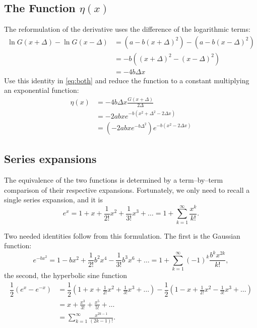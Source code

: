 \documentclass[10pt, oneside]{article}
\newcommand{\paren}[1]			{ \left(  #1 \right) }
\begin{document}
\subsection{The Function $\eta(x)$}
The reformulation of the derivative uses the difference of the logarithmic terms:
\begin{equation}
	\begin{split}
		\ln G\paren{x + \Delta} - \ln G\paren{x - \Delta} 
			&= \paren{a - b \paren{x+\Delta}^{2}} - \paren{a - b \paren{x-\Delta}^{2}} \\
			&= -b \paren{\paren{x+\Delta}^{2} - \paren{x-\Delta}^{2}} \\
			&= -4b\Delta x
	\end{split}
\end{equation}
Use this identity in \eqref{eq:both} and reduce the function to a constant multiplying an exponential function:
\begin{equation}
	\begin{split}
		\eta ( x )  &= -4b\Delta x \frac {G\paren{x + \Delta}} {2\Delta} \\
			&= -2abx e^{-b\paren{x^{2}+\Delta^{2}-2\Delta x}} \\
			&= \paren{-2abx e^{-b\Delta^{2}}} e^{-b\paren{x^{2}-2\Delta x}}
	\end{split}
\label{eq:eta}
\end{equation}

\subsection{Series expansions}
The equivalence of the two functions is determined by a term--by--term comparison of their respective expansions. Fortunately, we only need to recall a single series expansion, and it is
\begin{equation}
	e^{x} = 1 + x + \frac{1}{2!}x^{2} + \frac{1}{3!}x^{3} + \dots = 1 + \sum_{k=1}^{\infty} \frac{x^{k}}{k!}.
\label{eq:primus}
\end{equation}

Two needed identities follow from this formulation. The first is the Gaussian function:
\begin{equation}
	e^{-b x^{2}} = 1 - bx^{2} + \frac{1}{2!}b^{2}x^{4} - \frac{1}{3!}b^{3}x^{6} + \dots = 1 + \sum_{k=1}^{\infty} (-1)^{k}\frac{b^{k}x^{2k}}{k!},
\label{eq:secundus}
\end{equation}
the second, the hyperbolic sine function
\begin{equation}
	\begin{split}
		\dfrac{1}{2} \paren{e^{x} - e^{-x}} 
			&= \dfrac{1}{2} \paren{1 + x + \frac{1}{2!}x^{2} + \frac{1}{3!}x^{3} + \dots } - \dfrac{1}{2} \paren{1 - x + \frac{1}{2!}x^{2} - \frac{1}{3!}x^{3} + \dots} \\
			&= x + \frac{x^{3}}{3!}  + \frac{x^{5}}{5!} + \dots \\
			&= \sum_{k=1}^{\infty} \frac{x^{2k-1}}{\paren{2k-1}!}.
	\end{split}
\label{eq:tertius}
\end{equation}
\end{document}
